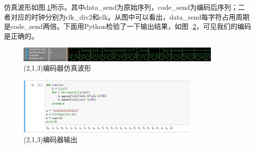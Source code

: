 仿真波形如图.\ref{fig:fangzhen}所示。其中data\_send为原始序列，code\_send为编码后序列；二者对应的时钟分别为clk\_div2和clk。从图中可以看出，data\_send每字符占用周期是code\_send两倍。下面用Python检验了一下输出结果，如图
.\ref{fig:PythonSimu}，可见我们的编码是正确的。

\begin{figure}[htb]
\centering
\includegraphics[width=0.9\textwidth]{images//encoder_simulation.jpg}
\caption{\label{fig:fangzhen}(2,1,3)编码器仿真波形}
\end{figure}

\begin{figure}[htb]
\centering
\includegraphics[width=0.8\textwidth]{images//python_simulation.jpg}
\caption{\label{fig:PythonSimu}(2,1,3)编码器输出}
\end{figure}

